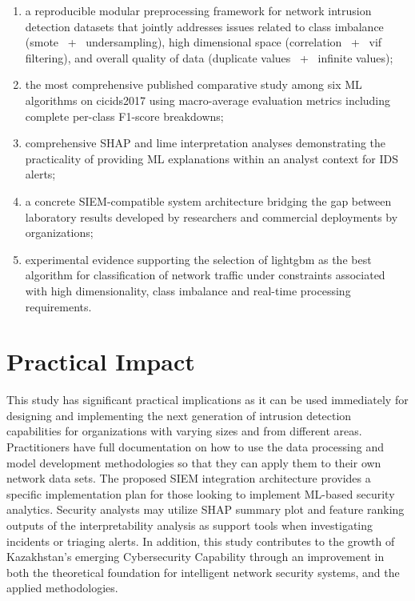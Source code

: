 \begin{enumerate}
\item a reproducible modular preprocessing framework for network intrusion detection datasets that jointly addresses issues related to class imbalance (smote ~+~ undersampling), high dimensional space (correlation ~+~ vif filtering), and overall quality of data (duplicate values ~+~ infinite values);
\item the most comprehensive published comparative study among six ML algorithms on cicids2017 using macro-average evaluation metrics including complete per-class F1-score breakdowns;
\item comprehensive SHAP and lime interpretation analyses demonstrating the practicality of providing ML explanations within an analyst context for IDS alerts;
\item a concrete SIEM-compatible system architecture bridging the gap between laboratory results developed by researchers and commercial deployments by organizations;
\item experimental evidence supporting the selection of lightgbm as the best algorithm for classification of network traffic under constraints associated with high dimensionality, class imbalance and real-time processing requirements.
\end{enumerate}

\section{Practical Impact}

This study has significant practical implications as it can be used immediately for designing and implementing the next generation of intrusion detection capabilities for organizations with varying sizes and from different areas. Practitioners have full documentation on how to use the data processing and model development methodologies so that they can apply them to their own network data sets. The proposed SIEM integration architecture provides a specific implementation plan for those looking to implement ML-based security analytics. Security analysts may utilize SHAP summary plot and feature ranking outputs of the interpretability analysis as support tools when investigating incidents or triaging alerts. In addition, this study contributes to the growth of Kazakhstan’s emerging Cybersecurity Capability through an improvement in both the theoretical foundation for intelligent network security systems, and the applied methodologies.

